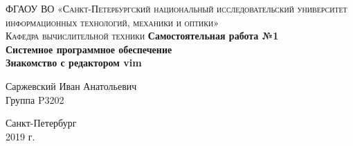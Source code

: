 \begin{titlepage}
\begin{center}

\textsc{ФГАОУ ВО «Санкт-Петербургский национальный исследовательский университет информационных технологий, механики и оптики»\\[4mm]
Кафедра вычислительной техники}
\vfill
\textbf{Самостоятельная работа №1\\[4mm]
Системное программное обеспечение\\[4mm]
Знакомство с редактором vim\\[16mm]
}
\begin{flushright}
Саржевский Иван Анатольевич
\\[2mm]Группа P3202
\end{flushright}
\vfill
Санкт-Петербург\\[2mm]
2019 г.

\end{center}
\end{titlepage}
